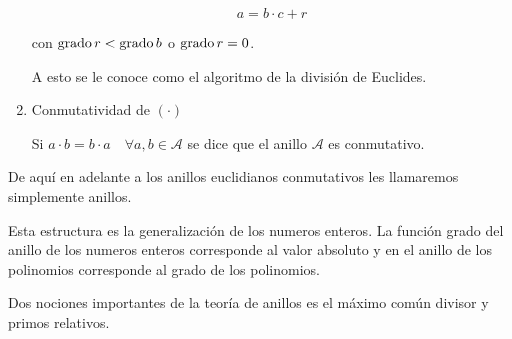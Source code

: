 \begin{enumerate}
            \begin{equation*}
                a = b \cdot c + r
            \end{equation*}

            con $\operatorname{grado}{r} < \operatorname{grado}{b}$ o $\operatorname{grado}{r} = 0$.

            A esto se le conoce como el algoritmo de la división de Euclides.
            \item Conmutatividad de $(\cdot)$

            Si $a \cdot b = b \cdot a \quad \forall a, b \in \mathcal{A}$ se dice que el anillo $\mathcal{A}$ es conmutativo.
        \end{enumerate}

        De aquí en adelante a los anillos euclidianos conmutativos les llamaremos simplemente anillos.

        Esta estructura es la generalización de los numeros enteros. La función grado del anillo de los numeros enteros corresponde al valor absoluto y en el anillo de los polinomios corresponde al grado de los polinomios.

        Dos nociones importantes de la teoría de anillos es el máximo común divisor y primos relativos.


